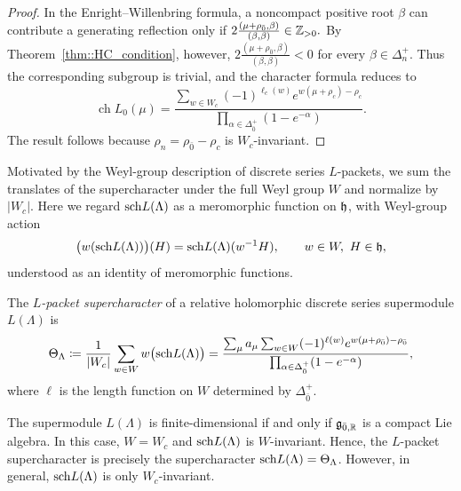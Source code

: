 \begin{proof}
In the Enright--Willenbring formula, a noncompact positive root $\beta$ can contribute a generating reflection only if
$
2\frac{(\mu+\rho_{\bar0},\beta)}{(\beta,\beta)}\in{\mathbb Z}_{>0}.
$
By Theorem~\ref{thm::HC_condition}, however,
$
2\frac{(\mu+\rho_{\bar0},\beta)}{(\beta,\beta)}<0
$
for every $\beta\in\Delta_n^+$. Thus the corresponding subgroup is trivial, and the character formula reduces to
\begin{equation*}
\operatorname{ch}L_0(\mu)
=
\frac{
\sum_{w\in W_c}
(-1)^{\ell_c(w)}
e^{w(\mu+\rho_c)-\rho_c}
}{
\prod_{\alpha\in\Delta_{\bar0}^+}
(1-e^{-\alpha})
}.
\end{equation*}
The result follows because $\rho_n=\rho_{\bar0}-\rho_c$ is $W_c$-invariant.
\end{proof}

Motivated by the Weyl-group description of discrete series
$L$-packets, we sum the translates of the supercharacter
under the full Weyl group $W$ and normalize by $|W_c|$.
Here we regard ${\operatorname{sch}} L(\Lambda)$ as a meromorphic function
on ${\mathfrak h}$, with Weyl-group action
\begin{equation*}
\bigl(w({\operatorname{sch}} L(\Lambda))\bigr)(H)
=
{\operatorname{sch}} L(\Lambda)(w^{-1}H),
\qquad w\in W,\ H\in{\mathfrak h},
\end{equation*}
understood as an identity of meromorphic functions.

\begin{definition}\label{def::L_packet_supercharacter}
The \emph{$L$-packet supercharacter} of a relative holomorphic discrete series supermodule $L(\Lambda)$ is
\begin{equation*}
\Theta_\Lambda
\coloneqq
\frac{1}{|W_c|}
\sum_{w\in W}
w\bigl({\operatorname{sch}} L(\Lambda)\bigr)=
\frac{
\sum_\mu a_\mu
\sum_{w\in W}(-1)^{\ell(w)}
e^{w(\mu+\rho_{\bar0})-\rho_{\bar0}}
}{
\prod_{\alpha\in\Delta_{\bar0}^+}
(1-e^{-\alpha})
},
\end{equation*}
where $\ell$ is the length function on $W$ determined by $\Delta_{\bar0}^+$.
\end{definition}


\begin{remark}
    The supermodule $L(\Lambda)$ is finite-dimensional if and only if ${\mathfrak{g}}_{\bar{0},{\mathbb R}}$ is a compact Lie algebra. In this case, $W=W_{c}$ and ${\operatorname{sch}} L(\Lambda)$ is $W$-invariant. Hence, the $L$-packet supercharacter is precisely the supercharacter ${\operatorname{sch}} L(\Lambda)=\Theta_{\Lambda}$. However, in general, ${\operatorname{sch}} L(\Lambda)$ is only $W_{c}$-invariant.
\end{remark}


